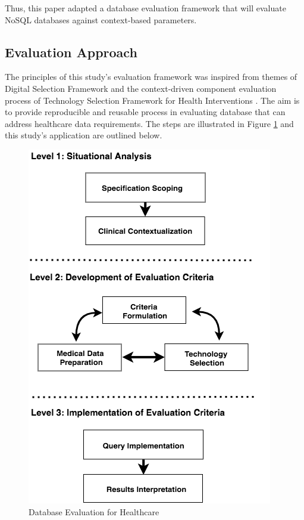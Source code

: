 \documentclass[5p]{elsarticle}
\begin{document}
Thus, this paper adapted a database evaluation framework that will evaluate NoSQL databases against context-based parameters. 

\subsection{Evaluation Approach}
The principles of this study's evaluation framework was inspired from themes of Digital Selection Framework \cite{A.Ostrovsky20141} 
and the context-driven component evaluation process of Technology Selection Framework for Health Interventions \cite{C.Chan2010300}. 
The aim is to provide reproducible and reusable process in evaluating database that can address healthcare data requirements.
The steps are illustrated in Figure \ref{fig.framework} and this study's application are outlined below. 

\begin{figure}[ht]
    \centering
    \includegraphics[scale=0.55] {SeDB6}
    \caption{Database Evaluation for Healthcare}\label{fig.framework}
\end{figure}
\end{document}
